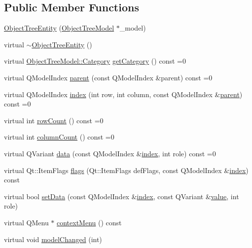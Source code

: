 \subsection*{Public Member Functions}
\begin{DoxyCompactItemize}
\item 
\mbox{\hyperlink{classobjecttree_1_1_object_tree_entity_ad9edcfc24467898f1f2ca1e2a056e9b7}{Object\+Tree\+Entity}} (\mbox{\hyperlink{class_object_tree_model}{Object\+Tree\+Model}} $\ast$\+\_\+model)
\item 
virtual \mbox{\hyperlink{classobjecttree_1_1_object_tree_entity_a75e8f60c430ead9cda0593c53d1cb82b}{$\sim$\+Object\+Tree\+Entity}} ()
\item 
virtual \mbox{\hyperlink{class_object_tree_model_a379e9d6b0d381853785adf62095ba4e3}{Object\+Tree\+Model\+::\+Category}} \mbox{\hyperlink{classobjecttree_1_1_object_tree_entity_aa4e80e7fa80672c1b9902add665abc77}{get\+Category}} () const =0
\item 
virtual Q\+Model\+Index \mbox{\hyperlink{classobjecttree_1_1_object_tree_entity_a2d1b13c056476f87637aacd7e99e7305}{parent}} (const Q\+Model\+Index \&parent) const =0
\item 
virtual Q\+Model\+Index \mbox{\hyperlink{classobjecttree_1_1_object_tree_entity_a9ccaab3b27e65b1ed8b22f00c57a1082}{index}} (int row, int column, const Q\+Model\+Index \&\mbox{\hyperlink{classobjecttree_1_1_object_tree_entity_a2d1b13c056476f87637aacd7e99e7305}{parent}}) const =0
\item 
virtual int \mbox{\hyperlink{classobjecttree_1_1_object_tree_entity_a82c626bb28c55dcfce11cf7ec3368588}{row\+Count}} () const =0
\item 
virtual int \mbox{\hyperlink{classobjecttree_1_1_object_tree_entity_a70fd25eccf88b305e9db15fbe3daeae8}{column\+Count}} () const =0
\item 
virtual Q\+Variant \mbox{\hyperlink{classobjecttree_1_1_object_tree_entity_a2413c6573de18b451d97eb3800f10f35}{data}} (const Q\+Model\+Index \&\mbox{\hyperlink{classobjecttree_1_1_object_tree_entity_a9ccaab3b27e65b1ed8b22f00c57a1082}{index}}, int role) const =0
\item 
virtual Qt\+::\+Item\+Flags \mbox{\hyperlink{classobjecttree_1_1_object_tree_entity_a71042bfb5a8328bcbde9d283c0b1b28c}{flags}} (Qt\+::\+Item\+Flags def\+Flags, const Q\+Model\+Index \&\mbox{\hyperlink{classobjecttree_1_1_object_tree_entity_a9ccaab3b27e65b1ed8b22f00c57a1082}{index}}) const
\item 
virtual bool \mbox{\hyperlink{classobjecttree_1_1_object_tree_entity_ab6742194e637093cb1571998bee88ff5}{set\+Data}} (const Q\+Model\+Index \&\mbox{\hyperlink{classobjecttree_1_1_object_tree_entity_a9ccaab3b27e65b1ed8b22f00c57a1082}{index}}, const Q\+Variant \&\mbox{\hyperlink{diffusion_8cpp_a4b41795815d9f3d03abfc739e666d5da}{value}}, int role)
\item 
virtual Q\+Menu $\ast$ \mbox{\hyperlink{classobjecttree_1_1_object_tree_entity_a0dd10b6074f96af281b6f7a68c492b75}{context\+Menu}} () const
\item 
virtual void \mbox{\hyperlink{classobjecttree_1_1_object_tree_entity_a167db83e542f7e9e760e7e2a5548cc3a}{model\+Changed}} (int)
\end{DoxyCompactItemize}
